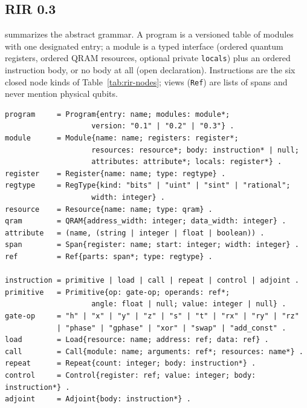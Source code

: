 \subsection{RIR 0.3}
\label{app:spec-rir}

 summarizes the abstract grammar.  A program is a
versioned table of modules with one designated entry; a module is a typed
interface (ordered quantum registers, ordered QRAM resources, optional
private \texttt{locals}) plus an ordered instruction body, or no body at
all (open declaration).  Instructions are the six closed node kinds of
Table~\ref{tab:rir-nodes}; views (\texttt{Ref}) are lists of spans and
never mention physical qubits.

\begin{lstlisting}[style=pyqbase, caption={Abstract grammar of the RIR 0.3 object model.  $X^{*}$ denotes an ordered immutable tuple (possibly empty); \texttt{null} marks an absent body or an unused field; \texttt{name} matches \texttt{[A-Za-z\_][A-Za-z0-9\_]*}.  Shape only: alias-freedom, control protection, call matching, and numeric ranges are enforced by the semantic validator (\secref{sec:rir}).}, label={lst:rir-grammar}]
program     = Program{entry: name; modules: module*;
                    version: "0.1" | "0.2" | "0.3"} .
module      = Module{name: name; registers: register*;
                    resources: resource*; body: instruction* | null;
                    attributes: attribute*; locals: register*} .
register    = Register{name: name; type: regtype} .
regtype     = RegType{kind: "bits" | "uint" | "sint" | "rational";
                    width: integer} .
resource    = Resource{name: name; type: qram} .
qram        = QRAM{address_width: integer; data_width: integer} .
attribute   = (name, (string | integer | float | boolean)) .
span        = Span{register: name; start: integer; width: integer} .
ref         = Ref{parts: span*; type: regtype} .

instruction = primitive | load | call | repeat | control | adjoint .
primitive   = Primitive{op: gate-op; operands: ref*;
                    angle: float | null; value: integer | null} .
gate-op     = "h" | "x" | "y" | "z" | "s" | "t" | "rx" | "ry" | "rz"
            | "phase" | "gphase" | "xor" | "swap" | "add_const" .
load        = Load{resource: name; address: ref; data: ref} .
call        = Call{module: name; arguments: ref*; resources: name*} .
repeat      = Repeat{count: integer; body: instruction*} .
control     = Control{register: ref; value: integer; body: instruction*} .
adjoint     = Adjoint{body: instruction*} .
\end{lstlisting}

